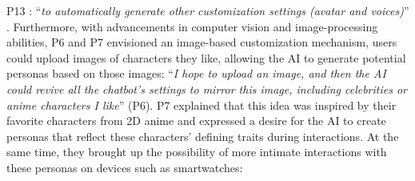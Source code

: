 P13 : ``\textit{to automatically generate other customization settings (avatar and voices)}'' . 
Furthermore, with advancements in computer vision and image-processing abilities, P6 and P7 envisioned an image-based customization mechanism,  users could upload images of characters they like, allowing the AI to generate potential personas based on those images: %
``\textit{I hope to upload an image, and then the AI could revive all the chatbot's settings to mirror this image, including celebrities or anime characters I like}'' (P6). 
P7 explained that this idea was inspired by their favorite characters from 2D anime and expressed a desire for the AI to create personas that reflect these characters' defining traits during interactions. At the same time, they brought up the possibility of more intimate interactions with these personas on devices such as smartwatches:

